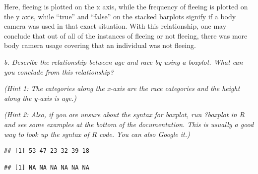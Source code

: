 \documentclass[
]{article}
\newenvironment{Shaded}{\begin{snugshade}}{\end{snugshade}}
\newcommand{\AttributeTok}[1]{\textcolor[rgb]{0.77,0.63,0.00}{#1}}
\newcommand{\ConstantTok}[1]{\textcolor[rgb]{0.00,0.00,0.00}{#1}}
\newcommand{\FunctionTok}[1]{\textcolor[rgb]{0.00,0.00,0.00}{#1}}
\newcommand{\NormalTok}[1]{#1}
\newcommand{\OtherTok}[1]{\textcolor[rgb]{0.56,0.35,0.01}{#1}}
\newcommand{\SpecialCharTok}[1]{\textcolor[rgb]{0.00,0.00,0.00}{#1}}
\newcommand{\StringTok}[1]{\textcolor[rgb]{0.31,0.60,0.02}{#1}}
\begin{document}
Here, fleeing is plotted on the x axis, while the frequency of fleeing
is plotted on the y axis, while ``true'' and ``false'' on the stacked
barplots signify if a body camera was used in that exact situation. With
this relationship, one may conclude that out of all of the instances of
fleeing or not fleeing, there was more body camera usage covering that
an individual was not fleeing.

\emph{b. Describe the relationship between age and race by using a
boxplot. What can you conclude from this relationship? }

\emph{(Hint 1: The categories along the x-axis are the race categories
and the height along the y-axis is age.)}

\emph{(Hint 2: Also, if you are unsure about the syntax for boxplot, run
?boxplot in R and see some examples at the bottom of the documentation.
This is usually a good way to look up the syntax of R code. You can also
Google it.)}

\begin{Shaded}
\end{Shaded}

\begin{verbatim}
## [1] 53 47 23 32 39 18
\end{verbatim}

\begin{Shaded}
\end{Shaded}

\begin{verbatim}
## [1] NA NA NA NA NA NA
\end{verbatim}

\begin{Shaded}
\end{Shaded}
\end{document}
